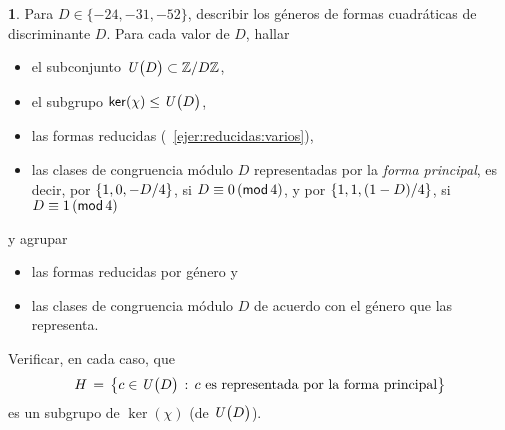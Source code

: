 \theoremstyle{definition}
\newtheorem{ejerDirichlet}{\ejername}[section]


\begin{ejerDirichlet}\label{ejer:dirichlet:generos}
	Para $D\in\{-24,-31,-52\}$, describir los g\'eneros de formas
	cuadr\'aticas de discriminante $D$.
	Para cada valor de $D$, hallar
	\begin{itemize}
		\item el subconjunto $\Unidadesmod[D]\subset\Enterosmod[D]$,
		\item el subgrupo $\ker(\chi)\subgrp\Unidadesmod[D]$,
		\item las formas reducidas
			(\ejername~\ref{ejer:reducidas:varios}),
		\item las clases de congruencia m\'odulo $D$ representadas
			por la \emph{forma principal}, es decir, por
			$\binaria{1,0,-D/4}$, si $D\equiv 0\tmodulo[4]$,
			y por $\binaria{1,1,(1-D)/4}$, si
			$D\equiv 1\tmodulo[4]$
	\end{itemize}
	y agrupar
	\begin{itemize}
		\item las formas reducidas por g\'enero y
		\item las clases de congruencia m\'odulo $D$ de acuerdo
			con el g\'enero que las representa.
	\end{itemize}
	Verificar, en cada caso, que
	\begin{displaymath}
		H\,=\,\big\{c\in\Unidadesmod[D]\,:\,
			c\text{ es representada por la forma principal}
			\big\}
	\end{displaymath}
	es un subgrupo de $\ker(\chi)$ (de $\Unidadesmod[D]$).
\end{ejerDirichlet}

